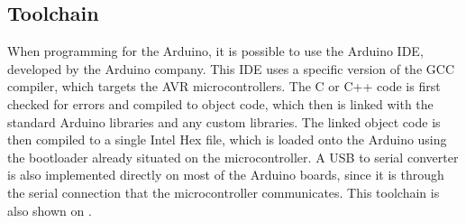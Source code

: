 \subsection{Toolchain}
When programming for the Arduino, it is possible to use the Arduino IDE, developed by the Arduino company.
This IDE uses a specific version of the GCC compiler, which targets the AVR microcontrollers.
The C or C++ code is first checked for errors and compiled to object code, which then is linked with the standard Arduino libraries and any custom libraries.
The linked object code is then compiled to a single Intel Hex file, which is loaded onto the Arduino using the bootloader already situated on the microcontroller.
A USB to serial converter is also implemented directly on most of the Arduino boards, since it is through the serial connection that the microcontroller communicates. 
This toolchain is also shown on .\cite{2015ArduinoToolchain}


